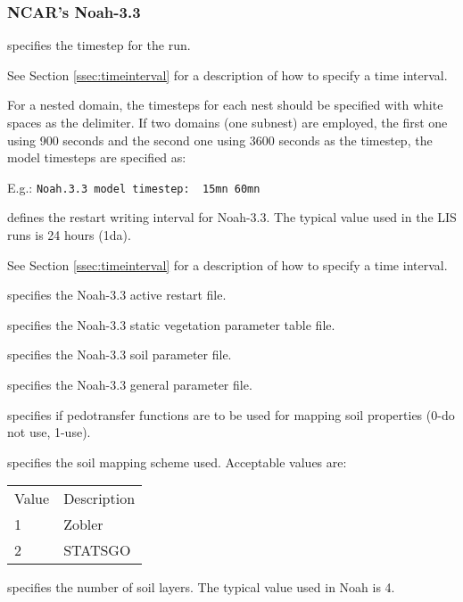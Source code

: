  
 \subsubsection{NCAR's Noah-3.3} \label{sssec:lsm_noah33}
 

 
  specifies the timestep for the run.

 See Section \ref{ssec:timeinterval} for a description
 of how to specify a time interval.

 For a nested domain, the timesteps for each nest should be specified
 with white spaces as the delimiter. If two domains (one subnest) are
 employed, the first one using 900 seconds and the second one using
 3600 seconds as the timestep, the model timesteps are specified as:

 E.g.: \quad \verb+Noah.3.3 model timestep:  15mn 60mn+

  defines the restart
 writing interval for Noah-3.3. The typical value used in the
 LIS runs is 24 hours (1da).

 See Section \ref{ssec:timeinterval} for a description
 of how to specify a time interval.

  specifies the Noah-3.3 active
 restart file.

  specifies the
 Noah-3.3 static vegetation parameter table file.

  specifies the
 Noah-3.3 soil parameter file.

  specifies the
 Noah-3.3 general parameter file.

  specifies if
 pedotransfer functions are to be used for mapping soil properties
 (0-do not use, 1-use).

  specifies the soil mapping scheme used.
 Acceptable values are:

 \begin{tabular}{ll}
 Value & Description \\
 1     & Zobler      \\
 2     & STATSGO     \\
 \end{tabular}

  specifies the number of
 soil layers. The typical value used in Noah is 4.

